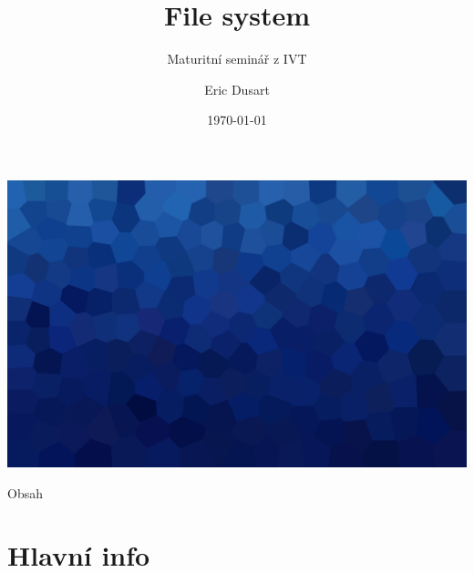 \documentclass[aspectratio=169,xcolor=dvipsnames, t]{beamer}
\title[]{File system} %
\subtitle{Maturitní seminář z IVT}
\author[Dusart]{Eric Dusart}
\institute[GEVO]{Gymnázium Evolution Jižní Město}
\date{\today}
\begin{document}
\maketitlepage
{
{
    \includegraphics[width=\paperwidth,height=\paperheight]{AICStyleData/logos/mene_polygonu_bg.png}
}

\begin{frame}[t]{Obsah}
    \tableofcontents
\end{frame}
}
\section{Hlavní info}
\end{document}
